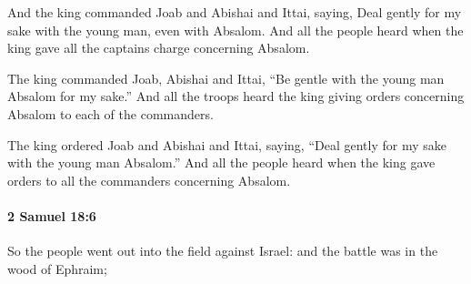			\begin{versebox}
					\item[BHS] 
					\item[ASV] And the king commanded Joab and Abishai and Ittai, saying, Deal gently for my sake with the young man, even with Absalom. And all the people heard when the king gave all the captains charge concerning Absalom.
					\item[NIV] The king commanded Joab, Abishai and Ittai, “Be gentle with the young man Absalom for my sake.” And all the troops heard the king giving orders concerning Absalom to each of the commanders.
					\item[NRSV] The king ordered Joab and Abishai and Ittai, saying, “Deal gently for my sake with the young man Absalom.” And all the people heard when the king gave orders to all the commanders concerning Absalom.
			\end{versebox}

		\paragraph{2 Samuel 18:6} %
			\label{2SAMUEL-18-6}

			So the people went out into the field against Israel: and the battle was in the wood of Ephraim;

